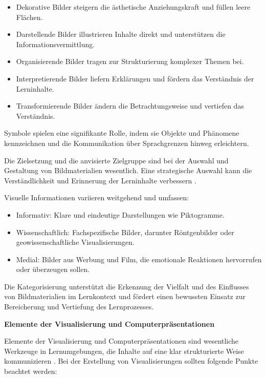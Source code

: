 \begin{itemize}
	\item Dekorative Bilder steigern die ästhetische Anziehungskraft und füllen leere Flächen.
	\item Darstellende Bilder illustrieren Inhalte direkt und unterstützen die Informationsvermittlung.
	\item Organisierende Bilder tragen zur Strukturierung komplexer Themen bei.
	\item Interpretierende Bilder liefern Erklärungen und fördern das Verständnis der Lerninhalte.
	\item Transformierende Bilder ändern die Betrachtungsweise und vertiefen das Verständnis.
\end{itemize}

Symbole spielen eine signifikante Rolle, indem sie Objekte und Phänomene kennzeichnen und die Kommunikation über Sprachgrenzen hinweg erleichtern.

Die Zielsetzung und die anvisierte Zielgruppe sind bei der Auswahl und Gestaltung von Bildmaterialien wesentlich. Eine strategische Auswahl kann die Verständlichkeit und Erinnerung der Lerninhalte verbessern \cite{Bilek2007}.

Visuelle Informationen variieren weitgehend und umfassen:

\begin{itemize}
	\item Informativ: Klare und eindeutige Darstellungen wie Piktogramme.
	\item Wissenschaftlich: Fachspezifische Bilder, darunter Röntgenbilder oder geowissenschaftliche Visualisierungen.
	\item Medial: Bilder aus Werbung und Film, die emotionale Reaktionen hervorrufen oder überzeugen sollen.
\end{itemize}

Die Kategorisierung unterstützt die Erkennung der Vielfalt und des Einflusses von Bildmaterialien im Lernkontext und fördert einen bewussten Einsatz zur Bereicherung und Vertiefung des Lernprozesses.

\textbf{Elemente der Visualisierung und Computerpräsentationen}

Elemente der Visualisierung und Computerpräsentationen sind wesentliche Werkzeuge in Lernumgebungen, die Inhalte auf eine klar strukturierte Weise kommunizieren \cite{Bilek2007}. Bei der Erstellung von Visualisierungen sollten folgende Punkte beachtet werden:

